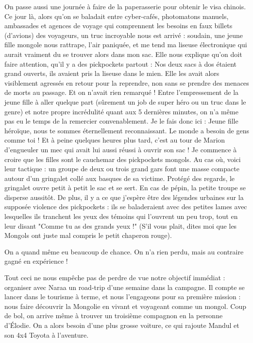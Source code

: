 \documentclass{book}
\begin{document}
On passe aussi une journée à faire de la paperasserie pour obtenir le visa chinois. Ce jour là, alors qu'on se baladait entre cyber-cafés, photomatons manuels, ambassades et agences de voyage qui comprennent les besoins en faux billets (d'avions) des voyageurs, un truc incroyable nous est arrivé : soudain, une jeune fille mongole nous rattrape, l'air paniquée, et me tend ma liseuse électronique qui aurait vraiment du se trouver alors dans mon sac. Elle nous explique qu'on doit faire attention, qu'il y a des pickpockets partout : Nos deux sacs à dos étaient grand ouverts, ils avaient pris la liseuse dans le mien. Elle les avait alors visiblement agressés en retour pour la reprendre, non sans se prendre des menaces de morts au passage. Et on n'avait rien remarqué ! Entre l'empressement de la jeune fille à aller quelque part (sûrement un job de super héro ou un truc dans le genre) et notre propre incrédulité quant aux 5 dernières minutes, on n'a même pas eu le temps de la remercier convenablement. Je le fais donc ici : Jeune fille héroïque, nous te sommes éternellement reconnaissant. Le monde a besoin de gens comme toi !
Et à peine quelques heures plus tard, c'est au tour de Marion d'engueuler un mec qui avait lui aussi réussi à ouvrir son sac ! Je commence à croire que les filles sont le cauchemar des pickpockets mongols. Au cas où, voici leur tactique : un groupe de deux ou trois grand gars font une masse compacte autour d'un gringalet collé aux basques de sa victime. Protégé des regards, le gringalet ouvre petit à petit le sac et se sert. En cas de pépin, la petite troupe se disperse aussitôt. De plus, il y a ce que j'espère être des légendes urbaines sur la supposée violence des pickpockets : ils se baladeraient avec des petites lames avec lesquelles ils tranchent les yeux des témoins qui l'ouvrent un peu trop, tout en leur disant "Comme tu as des grands yeux !" (S'il vous plait, dites moi que les Mongols ont juste mal compris le petit chaperon rouge).

On a quand même eu beaucoup de chance. On n'a rien perdu, mais au contraire gagné en expérience !

Tout ceci ne nous empêche pas de perdre de vue notre objectif immédiat : organiser avec Naraa un road-trip d'une semaine dans la campagne. Il compte se lancer dans le tourisme à terme, et nous l'engageons pour sa première mission : nous faire découvrir la Mongolie en vivant et voyageant comme un mongol. Coup de bol, on arrive même à trouver un troisième compagnon en la personne d’Élodie. On a alors besoin d'une plus grosse voiture, ce qui rajoute Mandul et son 4x4 Toyota à l'aventure.
\end{document}
